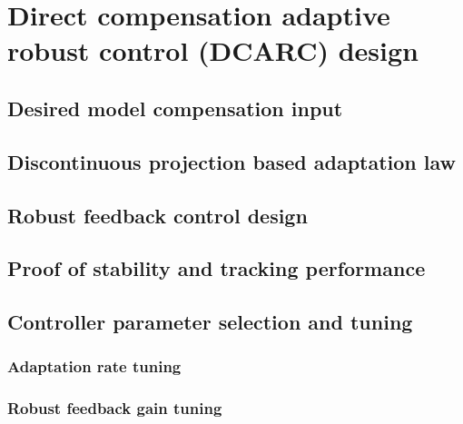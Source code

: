 \section{Direct compensation adaptive robust control (DCARC) design}



\subsection{Desired model compensation input}

\subsection{Discontinuous projection based adaptation law}

\subsection{Robust feedback control design}

\subsection{Proof of stability and tracking performance}

\subsection{Controller parameter selection and tuning}

\subsubsection{Adaptation rate tuning}
\subsubsection{Robust feedback gain tuning}
